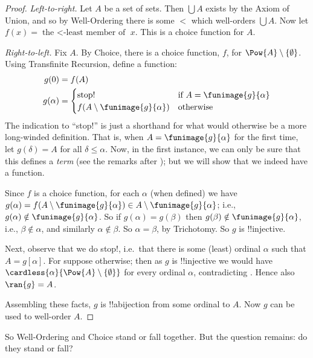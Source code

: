 \documentclass[../../../include/open-logic-section]{subfiles}
\begin{document}
\begin{proof}
\emph{Left-to-right.} Let $A$ be a set of sets. Then $\bigcup A$
exists by the Axiom of Union, and so by Well-Ordering there is some
$<$ which well-orders $\bigcup A$. Now let $f(x) = \text{the $<$-least
member of }x$. This is a choice function for $A$.

\emph{Right-to-left.} Fix $A$. By Choice, there is a choice function,
$f$,  for $\Pow{A} \setminus \{\emptyset\}$. Using Transfinite
Recursion, define a function:
\begin{align*}
	g(0) &= f(A)\\
	g(\alpha) &= 
		\begin{cases}
			\text{stop!{}} &\text{if }A = \funimage{g}{\alpha}\\
			f(A \setminus \funimage{g}{\alpha}) & \text{otherwise}\\	
		\end{cases}
\end{align*}
The indication to ``stop!'' is just a shorthand for what would
otherwise be a more long-winded definition. That is, when $A =
\funimage{g}{\alpha}$ for the first time, let $g(\delta) = A$ for all
$\delta \leq \alpha$. Now, in the first instance, we can only be sure that this defines a \emph{term} (see the remarks after ); but we will show that we indeed have a function.

Since $f$ is a choice function, for each $\alpha$ (when defined) we have $g(\alpha) =
f(A \setminus \funimage{g}{\alpha}) \in A \setminus
\funimage{g}{\alpha}$; i.e., $g(\alpha) \notin \funimage{g}{\alpha}$.
So if $g(\alpha) = g(\beta)$ then $g(\beta) \notin
\funimage{g}{\alpha}$, i.e., $\beta \notin \alpha$, and similarly
$\alpha \notin \beta$. So $\alpha = \beta$, by Trichotomy. So $g$ is
!!{injective}.

Next, observe that we do stop!{}, i.e.\ that there is some (least) ordinal $\alpha$ such that $A = g[\alpha]$. For suppose otherwise; then as $g$ is !!{injective} we would have $\cardless{\alpha}{\Pow{A} \setminus \{\emptyset\}}$ for
every ordinal $\alpha$, contradicting . Hence also $\ran{g} = A$.

Assembling these facts, $g$ is !!a{bijection} from some ordinal to $A$. Now $g$ can be used to well-order $A$.
\end{proof}

So Well-Ordering and Choice stand or fall together. But the question
remains: do they stand or fall?
\end{document}
